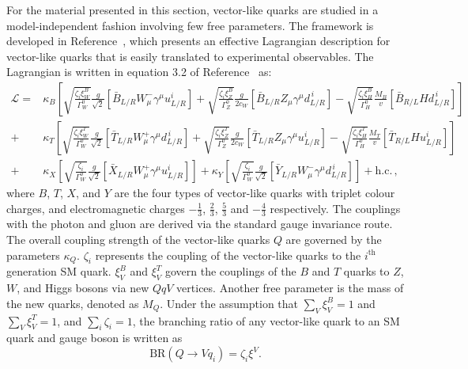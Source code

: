 For the material presented in this section, vector-like quarks are studied in a model-independent fashion involving few free parameters. The framework is developed in Reference~\cite{}, which presents an effective Lagrangian description for vector-like quarks that is easily translated to experimental observables. The Lagrangian is written in equation 3.2 of Reference~\cite{} as:
\begin{equation}
  \label{eq:vlqlagr}
  \begin{split}
    \mathcal{L} =
    &  \kappa_B \left[
      \sqrt{\frac{\zeta_i\xi^{B}_{W}}{\Gamma^0_{W}}} \frac{g}{\sqrt{2}} [\bar{B}_{L/R} W^-_\mu \gamma^\mu u^i_{L/R}]
      +  \sqrt{\frac{\zeta_i\xi^{B}_{Z}}{\Gamma^0_{Z}}} \frac{g}{2c_W} [\bar{B}_{L/R} Z_\mu \gamma^\mu d^{\,i}_{L/R}]
      -  \sqrt{\frac{\zeta_i\xi^{B}_{H}}{\Gamma^0_{H}}} \frac{M_B}{v} [\bar{B}_{R/L} H d^{\,i}_{L/R}]
    \right] \\
    + &   \kappa_T \left[
      \sqrt{\frac{\zeta_i\xi^{T}_{W}}{\Gamma^0_{W}}} \frac{g}{\sqrt{2}} [\bar{T}_{L/R} W^+_\mu \gamma^\mu d^{\,i}_{L/R}]
      +  \sqrt{\frac{\zeta_i\xi^{T}_{Z}}{\Gamma^0_{Z}}} \frac{g}{2c_W} [\bar{T}_{L/R} Z_\mu \gamma^\mu u^i_{L/R}]
      -  \sqrt{\frac{\zeta_i\xi^{T}_{H}}{\Gamma^0_{H}}} \frac{M_T}{v} [\bar{T}_{R/L} H u^i_{L/R}]
    \right] \\
    +  &  \kappa_X \left[
      \sqrt{\frac{\zeta_i}{\Gamma^0_{W}}} \frac{g}{\sqrt{2}} [\bar{X}_{L/R} W^+_\mu \gamma^\mu u^i_{L/R}]
    \right]
    + \kappa_Y \left[
      \sqrt{\frac{\zeta_i}{\Gamma^0_{W}}} \frac{g}{\sqrt{2}} [\bar{Y}_{L/R} W^-_\mu \gamma^\mu d^{\,i}_{L/R}]
    \right] + \text{h.c.} \, ,
  \end{split}
\end{equation}
where $B$, $T$, $X$, and $Y$ are the four types of vector-like quarks with triplet colour charges, and electromagnetic charges $-\frac{1}{3}$, $\frac{2}{3}$, $\frac{5}{3}$ and $-\frac{4}{3}$ respectively. The couplings with the photon and gluon are derived via the standard gauge invariance route. The overall coupling strength of the vector-like quarks $Q$ are governed by the parameters $\kappa_Q$. $\zeta_i$ represents the coupling of the vector-like quarks to the $i^\text{th}$ generation SM quark. $\xi^B_V$ and $\xi^T_V$ govern the couplings of the $B$ and $T$ quarks to $Z$, $W$, and Higgs bosons via new $QqV$ vertices. Another free parameter is the mass of the new quarks, denoted as $M_Q$. Under the assumption that $\sum_{V} \xi^B_{V} = 1$ and $\sum_{V} \xi^T_{V} = 1$, and $\sum_{i} \zeta_i = 1$, the branching ratio of any vector-like quark to an SM quark and gauge boson is written as
\begin{equation}
    \textrm{BR}(Q \rightarrow Vq_i) = \zeta_i\xi^{V}.
\end{equation}


